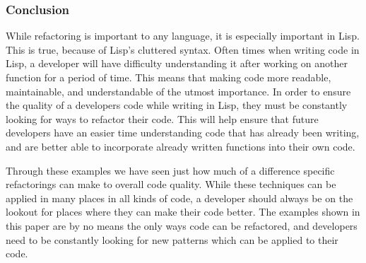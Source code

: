 \subsubsection{Conclusion}
 
While refactoring is important to any language, it is especially important in Lisp. This is true, because of Lisp’s cluttered syntax. Often times when writing code in Lisp, a developer will have difficulty understanding it after working on another function for a period of time. This means that making code more readable, maintainable, and understandable of the utmost importance. In order to ensure the quality of a developers code while writing in Lisp, they must be constantly looking for ways to refactor their code. This will help ensure that future developers have an easier time understanding code that has already been writing, and are better able to incorporate already written functions into their own code.
 
Through these examples we have seen just how much of a difference specific refactorings can make to overall code quality. While these techniques can be applied in many places in all kinds of code, a developer should always be on the lookout for places where they can make their code better. The examples shown in this paper are by no means the only ways code can be refactored, and developers need to be constantly looking for new patterns which can be applied to their code.
